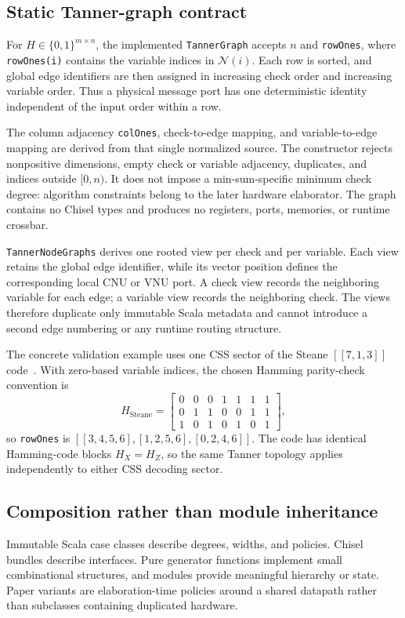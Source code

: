 \documentclass[10pt,conference]{IEEEtran}
\begin{document}
\subsection{Static Tanner-graph contract}
For $H\in\{0,1\}^{m\times n}$, the implemented \texttt{TannerGraph} accepts
$n$ and \texttt{rowOnes}, where \texttt{rowOnes(i)} contains the variable
indices in $\mathcal{N}(i)$.  Each row is sorted, and global edge identifiers
are then assigned in increasing check order and increasing variable order.
Thus a physical message port has one deterministic identity independent of the
input order within a row.

The column adjacency \texttt{colOnes}, check-to-edge mapping, and
variable-to-edge mapping are derived from that single normalized source.  The
constructor rejects nonpositive dimensions, empty check or variable adjacency,
duplicates, and indices outside $[0,n)$.  It does not impose a min-sum-specific
minimum check degree: algorithm constraints belong to the later hardware
elaborator.  The graph contains no Chisel types and produces no registers,
ports, memories, or runtime crossbar.

\texttt{TannerNodeGraphs} derives one rooted view per check and per variable.
Each view retains the global edge identifier, while its vector position defines
the corresponding local CNU or VNU port.  A check view records the neighboring
variable for each edge; a variable view records the neighboring check.  The
views therefore duplicate only immutable Scala metadata and cannot introduce a
second edge numbering or any runtime routing structure.

The concrete validation example uses one CSS sector of the Steane
$[[7,1,3]]$ code~\cite{steane1996}.  With zero-based variable indices, the
chosen Hamming parity-check convention is
\begin{equation}
 H_{\mathrm{Steane}} =
 \begin{bmatrix}
 0&0&0&1&1&1&1\\
 0&1&1&0&0&1&1\\
 1&0&1&0&1&0&1
 \end{bmatrix},
\end{equation}
so \texttt{rowOnes} is
$[[3,4,5,6],[1,2,5,6],[0,2,4,6]]$.  The code has identical Hamming-code
blocks $H_X=H_Z$, so the same Tanner topology applies independently to either
CSS decoding sector.

\subsection{Composition rather than module inheritance}
Immutable Scala case classes describe degrees, widths, and policies.  Chisel
bundles describe interfaces.  Pure generator functions implement small
combinational structures, and modules provide meaningful hierarchy or state.
Paper variants are elaboration-time policies around a shared datapath rather
than subclasses containing duplicated hardware.
\end{document}
